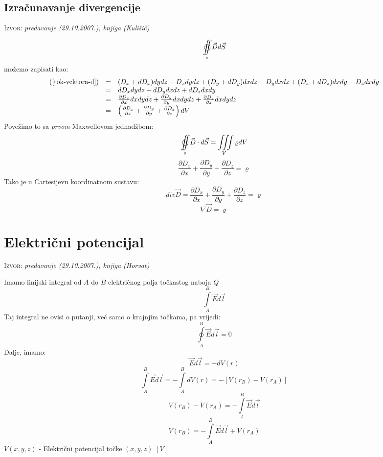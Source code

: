 \documentclass{report}
\begin{document}
\subsection{Izračunavanje divergencije}
\small \textsc{Izvor:} \textit{predavanje (29.10.2007.), knjiga (Kulišić)}

\begin{equation}
	\mathop{{\int\!\!\!\!\!\int}\mkern-21mu \bigcirc}\limits_s {\vec Dd\vec S}
	\label{tok-vektora-d}
\end{equation}
možemo zapisati kao:
$$\begin{array}{*{20}l}
   {(\ref{tok-vektora-d})} & = & (D _x + dD _x)dydz - D _x dydz + (D _y + dD _y)dxdz - D _y dxdz + (D _z + dD _z)dxdy - D _z dxdy \\
   {} & = & dD _x dydz + dD _y dxdz + dD _z dxdy  \\
   {} & = & \frac{\partial D _x}{\partial x} dxdydz + \frac{\partial D _y}{\partial y} dxdydz + \frac{\partial D _z}{\partial z} dxdydz \\
   {} & = & \left ( \frac{\partial D _x}{\partial x} + \frac{\partial D _y}{\partial y} + \frac{\partial D _z}{\partial z} \right ) dV \\
\end{array}$$
Povežimo to sa \textit{prvom} Maxwellovom jednadžbom:
$$\mathop{{\int\!\!\!\!\!\int}\mkern-21mu \bigcirc}\limits_s {\vec D \cdot d\vec S}  = \iiint\limits_V {\varrho dV}$$
$$\frac{\partial D _x}{\partial x} + \frac{\partial D _y}{\partial y} + \frac{\partial D _z}{\partial z} = \varrho $$
Tako je u Cartesijevu koordinatnom sustavu:
$$div \vec{D} = \frac{\partial D _x}{\partial x} + \frac{\partial D _y}{\partial y} + \frac{\partial D _z}{\partial z} = \varrho $$
\begin{equation}
	\nabla \vec{D} = \varrho
	\label{gradijent-vektoraD}
\end{equation}

\section{Električni potencijal}
\small \textsc{Izvor:} \textit{predavanje (29.10.2007.), knjiga (Horvat)}

Imamo linijski integral od $A$ do $B$ električnog polja točkastog naboja $Q$
$$\int\limits_A^B {\vec{E} d \vec{l}} $$
Taj integral ne ovisi o putanji, već samo o krajnjim točkama, pa vrijedi:
$$\oint\limits_A^B {\vec{E}d \vec{l}} = 0$$
Dalje, imamo:
$$\vec{E}d \vec{l} = -dV(r)$$
$$\int\limits_A^B {\vec{E}d \vec{l}} = - \int\limits_A^B {dV(r)} = - \left[ {V(r_B ) - V(r_A )} \right]$$
$$V(r_B ) - V(r_A ) = - \int\limits_A^B {\vec{E}d \vec{l}}$$
$$V(r_B) = - \int\limits_A^B {\vec{E}d \vec{l}} + V(r_A )$$
$V(x,y,z)$ - Električni potencijal točke $(x,y,z)$ $[V]$
\end{document}
